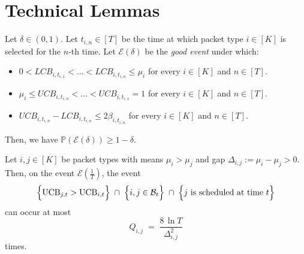 \section{Technical Lemmas}
\label{apx:results}
\begin{lemma}
\label{lem:good_event}
Let $\delta \in (0,1)$. Let $t_{i,n} \in [T]$ be the time at which packet type $i\in [K]$ is selected for the $n$-th time. Let $\mathcal{E}(\delta)$ be the \textit{good event} under which:
\begin{itemize}
    \item $0 < LCB_{i,t_{i,1}} < \ldots < LCB_{i,t_{i,n}} \le \mu_i$ for every $i \in [K]$ and $n \in [T]$.
    \item $\mu_i \le UCB_{i,t_{i,n}} < \ldots < UCB_{i,t_{i,1}} = 1$ for every $i \in [K]$ and $n \in [T]$.
    \item $UCB_{i,t_{i,n}}-LCB_{i,t_{i,n}}\le 2\beta_{i, t_{i,n}}$ for every $i \in [K]$ and $n \in [T]$.
\end{itemize}
Then, we have $\mathbb{P}(\mathcal{E}(\delta))\ge 1- \delta$.
\end{lemma}

\begin{lemma}
\label{lem:bound_comparison}
Let $i,j\in[K]$ be packet types with means $\mu_i>\mu_j$ and gap $\Delta_{i,j}:=\mu_i-\mu_j>0$. Then, on the event $\mathcal{E}\!\left(\frac{1}{T}\right)$, the event
\[
\Bigl\{\mathrm{UCB}_{j,t}>\mathrm{UCB}_{i,t}\Bigr\}\;\cap\;\Bigl\{i,j\in\mathcal{B}_t\Bigr\}\;\cap\;\Bigl\{j\text{ is scheduled at time }t\Bigr\}
\]
can occur at most
\[
Q_{i,j}\;=\;\frac{8\,\ln T}{\Delta_{i,j}^2}
\]
times.
\end{lemma}

